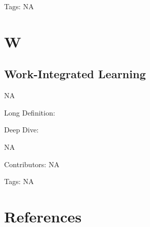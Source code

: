 \documentclass[
  letterpaper,
  DIV=11,
  numbers=noendperiod]{scrreprt}
\newlength{\cslhangindent}
\newenvironment{CSLReferences}[2] %
 {\begin{list}{}{%
  \setlength{\itemindent}{0pt}
  \setlength{\leftmargin}{0pt}
  \setlength{\parsep}{0pt}
  \ifodd #1
   \setlength{\leftmargin}{\cslhangindent}
   \setlength{\itemindent}{-1\cslhangindent}
  \fi
  \setlength{\itemsep}{#2\baselineskip}}}
 {\end{list}}
\begin{document}
Tags: NA


\chapter{W}\label{w}

\section{Work-Integrated Learning}\label{work-integrated-learning}

NA

Long Definition:

Deep Dive:

NA

Contributors: NA

Tags: NA


\chapter*{References}\label{references}


\label{refs}
\begin{CSLReferences}{0}{1}
\end{CSLReferences}
\end{document}
